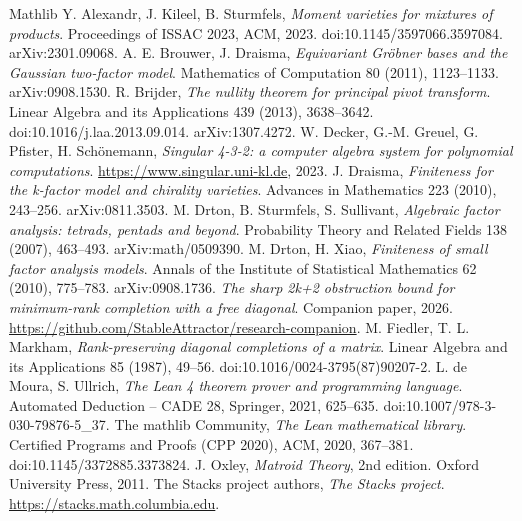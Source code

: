 \documentclass[11pt,letterpaper,reqno]{amsart}
\theoremstyle{spaced}
\begin{document}
\newpage\begin{thebibliography}{Mathlib}
\footnotesize\linespread{1}\selectfont\setlength{\itemsep}{0pt}\setlength{\parskip}{0pt}
 Y. Alexandr, J. Kileel, B. Sturmfels, \emph{Moment varieties for mixtures of products}. Proceedings of ISSAC 2023, ACM, 2023. doi:10.1145/3597066.3597084. arXiv:2301.09068.
 A. E. Brouwer, J. Draisma, \emph{Equivariant Gröbner bases and the Gaussian two-factor model}. Mathematics of Computation 80 (2011), 1123--1133. arXiv:0908.1530.
 R. Brijder, \emph{The nullity theorem for principal pivot transform}. Linear Algebra and its Applications 439 (2013), 3638--3642. doi:10.1016/j.laa.2013.09.014. arXiv:1307.4272.
 W. Decker, G.-M. Greuel, G. Pfister, H. Schönemann, \emph{Singular 4-3-2: a computer algebra system for polynomial computations}. \url{https://www.singular.uni-kl.de}, 2023.
 J. Draisma, \emph{Finiteness for the k-factor model and chirality varieties}. Advances in Mathematics 223 (2010), 243--256. arXiv:0811.3503.
 M. Drton, B. Sturmfels, S. Sullivant, \emph{Algebraic factor analysis: tetrads, pentads and beyond}. Probability Theory and Related Fields 138 (2007), 463--493. arXiv:math/0509390.
 M. Drton, H. Xiao, \emph{Finiteness of small factor analysis models}. Annals of the Institute of Statistical Mathematics 62 (2010), 775--783. arXiv:0908.1736.
 \emph{The sharp 2k+2 obstruction bound for minimum-rank completion with a free diagonal}. Companion paper, 2026. \url{https://github.com/StableAttractor/research-companion}.
 M. Fiedler, T. L. Markham, \emph{Rank-preserving diagonal completions of a matrix}. Linear Algebra and its Applications 85 (1987), 49--56. doi:10.1016/0024-3795(87)90207-2.
 L. de Moura, S. Ullrich, \emph{The Lean 4 theorem prover and programming language}. Automated Deduction -- CADE 28, Springer, 2021, 625--635. doi:10.1007/978-3-030-79876-5\_37.
 The mathlib Community, \emph{The Lean mathematical library}. Certified Programs and Proofs (CPP 2020), ACM, 2020, 367--381. doi:10.1145/3372885.3373824.
 J. Oxley, \emph{Matroid Theory}, 2nd edition. Oxford University Press, 2011.
 The Stacks project authors, \emph{The Stacks project}. \url{https://stacks.math.columbia.edu}.
\end{thebibliography}
\end{document}

